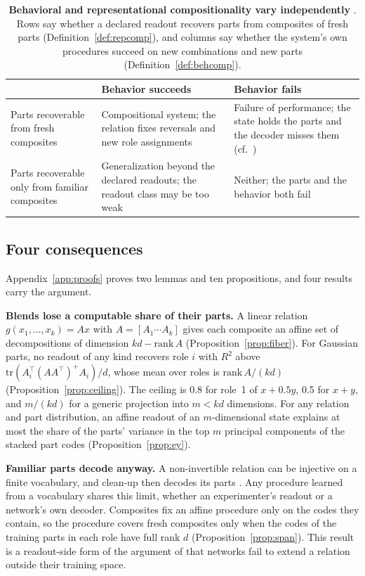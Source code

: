\documentclass[10pt]{article}
\theoremstyle{plain}
\theoremstyle{remark}
\begin{document}
\begin{table}[tbp]
  \caption{\textbf{Behavioral and representational compositionality vary independently} \citep[cf.][]{vegner2025}. Rows say whether a declared readout recovers parts from composites of fresh parts (Definition~\ref{def:repcomp}), and columns say whether the system's own procedures succeed on new combinations and new parts (Definition~\ref{def:behcomp}).}
  \label{tab:twobytwo}
  \centering\small
  \begin{tabularx}{\linewidth}{@{}P{3.2cm}YY@{}}
    \toprule
    & Behavior succeeds & Behavior fails \\
    \midrule
    Parts recoverable from fresh composites & Compositional system; the relation fixes reversals and new role assignments & Failure of performance; the state holds the parts and the decoder misses them (cf.\ \citealt{montero2021,park2024hidden}) \\
    Parts recoverable only from familiar composites & Generalization beyond the declared readouts; the readout class may be too weak & Neither; the parts and the behavior both fail \\
    \bottomrule
  \end{tabularx}
\end{table}

\subsection{Four consequences}
\label{sec:consequences}

Appendix~\ref{app:proofs} proves two lemmas and ten propositions, and four results carry the argument.

\textbf{Blends lose a computable share of their parts.} A linear relation $g(x_1, \ldots, x_k) = A x$ with $A = [A_1 \cdots A_k]$ gives each composite an affine set of decompositions of dimension $kd - \mathrm{rank}\,A$ (Proposition~\ref{prop:fiber}). For Gaussian parts, no readout of any kind recovers role $i$ with $R^2$ above $\mathrm{tr}(A_i^{\top}(AA^{\top})^{+}A_i)/d$, whose mean over roles is $\mathrm{rank}\,A/(kd)$ (Proposition~\ref{prop:ceiling}). The ceiling is 0.8 for role~1 of $x + 0.5y$, 0.5 for $x + y$, and $m/(kd)$ for a generic projection into $m < kd$ dimensions. For any relation and part distribution, an affine readout of an $m$-dimensional state explains at most the share of the parts' variance in the top $m$ principal components of the stacked part codes (Proposition~\ref{prop:ey}).

\textbf{Familiar parts decode anyway.} A non-invertible relation can be injective on a finite vocabulary, and clean-up then decodes its parts \citep{plate2003,frady2018}. Any procedure learned from a vocabulary shares this limit, whether an experimenter's readout or a network's own decoder. Composites fix an affine procedure only on the codes they contain, so the procedure covers fresh composites only when the codes of the training parts in each role have full rank $d$ (Proposition~\ref{prop:span}). This result is a readout-side form of the argument of \citet{marcus1998} that networks fail to extend a relation outside their training space.
\end{document}
